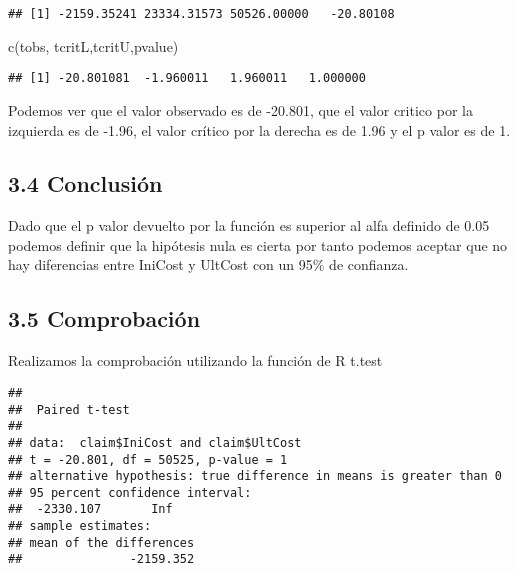 \documentclass[
  a4paper]{article}
\newenvironment{Shaded}{\begin{snugshade}}{\end{snugshade}}
\newcommand{\AttributeTok}[1]{\textcolor[rgb]{0.77,0.63,0.00}{#1}}
\newcommand{\ConstantTok}[1]{\textcolor[rgb]{0.00,0.00,0.00}{#1}}
\newcommand{\FunctionTok}[1]{\textcolor[rgb]{0.00,0.00,0.00}{#1}}
\newcommand{\NormalTok}[1]{#1}
\newcommand{\SpecialCharTok}[1]{\textcolor[rgb]{0.00,0.00,0.00}{#1}}
\newcommand{\StringTok}[1]{\textcolor[rgb]{0.31,0.60,0.02}{#1}}
\begin{document}
\begin{verbatim}
## [1] -2159.35241 23334.31573 50526.00000   -20.80108
\end{verbatim}

\begin{Shaded}
\begin{Highlighting}[]
\FunctionTok{c}\NormalTok{(tobs, tcritL,tcritU,pvalue)}
\end{Highlighting}
\end{Shaded}

\begin{verbatim}
## [1] -20.801081  -1.960011   1.960011   1.000000
\end{verbatim}

Podemos ver que el valor observado es de -20.801, que el valor critico
por la izquierda es de -1.96, el valor crítico por la derecha es de 1.96
y el p valor es de 1.

\hypertarget{conclusiuxf3n}{%
\subsection{3.4 Conclusión}\label{conclusiuxf3n}}

Dado que el p valor devuelto por la función es superior al alfa definido
de 0.05 podemos definir que la hipótesis nula es cierta por tanto
podemos aceptar que no hay diferencias entre IniCost y UltCost con un
95\% de confianza.

\hypertarget{comprobaciuxf3n}{%
\subsection{3.5 Comprobación}\label{comprobaciuxf3n}}

Realizamos la comprobación utilizando la función de R t.test

\begin{Shaded}
\end{Shaded}

\begin{verbatim}
## 
##  Paired t-test
## 
## data:  claim$IniCost and claim$UltCost
## t = -20.801, df = 50525, p-value = 1
## alternative hypothesis: true difference in means is greater than 0
## 95 percent confidence interval:
##  -2330.107       Inf
## sample estimates:
## mean of the differences 
##               -2159.352
\end{verbatim}
\end{document}

